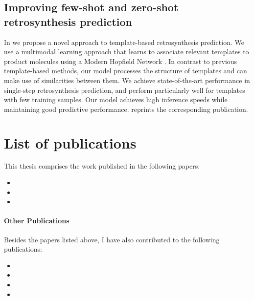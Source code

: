 \subsection{Improving few-shot and zero-shot retrosynthesis prediction}
In \citep{seidlImprovingFewZeroShot2022} we propose a novel approach to template-based
retrosynthesis prediction. We use a multimodal learning approach that learns to associate relevant
templates to product molecules using a Modern Hopfield Network
\citep{ramsauerHopfieldNetworksAll2020}. In contrast to previous template-based methods, our model
processes the structure of templates and can make use of similarities between them. We achieve
state-of-the-art performance in single-step retrosynthesis prediction, and perform particularly well
for templates with few training samples. Our model achieves high inference speeds while maintaining
good predictive performance.  reprints the corresponding publication.

\section{List of publications\label{sec:publications}} This thesis comprises the work published in
the following papers:

\begin{itemize}
    \item {}
    \item {}
    \item {}
\end{itemize}

\paragraph{Other Publications} Besides the papers listed above, I have also contributed to the
following publications:

\begin{itemize}
    \item {}
    \item {}
    \item {}
    \item {}
\end{itemize}